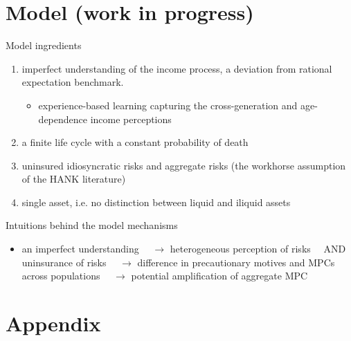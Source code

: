 \documentclass{beamer}
\begin{document}
\section{Model (work in progress)}

\begin{frame}{Model ingredients}
	
	\begin{enumerate}
		\item imperfect understanding of the income process, a deviation from rational expectation benchmark. 
		\begin{itemize}
			\item experience-based learning capturing the cross-generation and age-dependence income perceptions
		\end{itemize}
		\item a finite life cycle with a constant probability of death 
		\item uninsured idiosyncratic risks and aggregate risks (the workhorse assumption of the HANK literature) 
		\item single asset, i.e. no distinction between liquid and iliquid assets 
	\end{enumerate}
\end{frame}

\begin{frame}{Intuitions behind the model mechanisms}
	\begin{itemize}
		\item an imperfect understanding $ \quad \rightarrow$ heterogeneous perception of risks $ \quad \text{AND } $ uninsurance of risks $ \quad \rightarrow$ difference in precautionary motives and MPCs across populations $ \quad \rightarrow$ potential amplification of aggregate MPC
	\end{itemize}
\end{frame}





\section*{Appendix}
\end{document}
